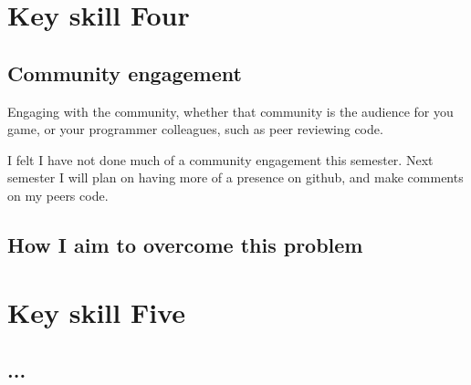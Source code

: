 \documentclass{scrartcl}
\begin{document}
\section{Key skill Four}
\subsection{Community engagement}

Engaging with the community, whether that community is the audience for you game, or your programmer colleagues, such as peer reviewing code.


I felt I have not done much of a community engagement this semester.
Next semester I will plan on having more of a presence on github, and make comments on my peers code.


\subsection{How I aim to overcome this problem}


\section{Key skill Five}
\subsection{...}
\end{document}
